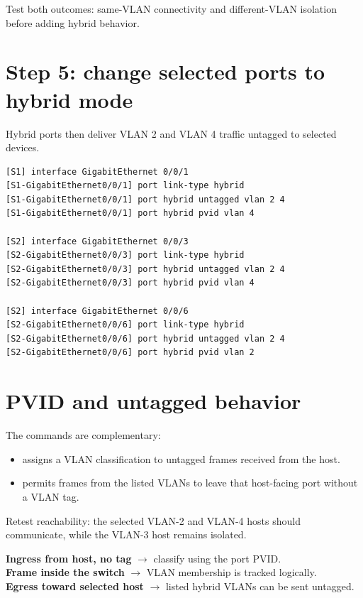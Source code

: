 
\begin{verification}
Test both outcomes: same-VLAN connectivity and different-VLAN isolation before adding hybrid behavior.
\end{verification}

\section{Step 5: change selected ports to hybrid mode}
Hybrid ports then deliver VLAN 2 and VLAN 4 traffic untagged to selected devices.
\begin{lstlisting}[style=dcnterminal]
[S1] interface GigabitEthernet 0/0/1
[S1-GigabitEthernet0/0/1] port link-type hybrid
[S1-GigabitEthernet0/0/1] port hybrid untagged vlan 2 4
[S1-GigabitEthernet0/0/1] port hybrid pvid vlan 4

[S2] interface GigabitEthernet 0/0/3
[S2-GigabitEthernet0/0/3] port link-type hybrid
[S2-GigabitEthernet0/0/3] port hybrid untagged vlan 2 4
[S2-GigabitEthernet0/0/3] port hybrid pvid vlan 4

[S2] interface GigabitEthernet 0/0/6
[S2-GigabitEthernet0/0/6] port link-type hybrid
[S2-GigabitEthernet0/0/6] port hybrid untagged vlan 2 4
[S2-GigabitEthernet0/0/6] port hybrid pvid vlan 2
\end{lstlisting}

\section{PVID and untagged behavior}
The commands are complementary:
\begin{itemize}
\item {} assigns a VLAN classification to untagged frames received from the host.
\item {} permits frames from the listed VLANs to leave that host-facing port without a VLAN tag.
\end{itemize}
Retest reachability: the selected VLAN-2 and VLAN-4 hosts should communicate, while the VLAN-3 host remains isolated.

\begin{conceptmap}
\textbf{Ingress from host, no tag} $\rightarrow$ classify using the port PVID.\\
\textbf{Frame inside the switch} $\rightarrow$ VLAN membership is tracked logically.\\
\textbf{Egress toward selected host} $\rightarrow$ listed hybrid VLANs can be sent untagged.
\end{conceptmap}

